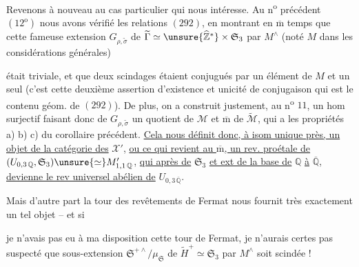 Revenons à nouveau au cas particulier qui nous intéresse. Au n\textsuperscript{o} précédent $(12^{\mathrm o})$ nous avons vérifié les  relations $(292)$, en montrant en $\overline{\mathrm m}$ temps que cette fameuse extension $G_{\rho,\widetilde\sigma}$ de $\widetilde\Gamma\simeq\unsure{\widehat{\mathbb Z}^{*}}\times\mathfrak S_3$ par $M^{\wedge}$ (noté $M$ dans les considérations générales)




était triviale, et que deux scindages étaient conjugués par un élément de $M$ et un seul (c'est cette deuxième assertion d'existence et unicité de conjugaison qui est le contenu géom. de $(292)$).
De plus, on a  construit justement, au n\textsuperscript{o} $11$, un hom surjectif
faisant donc de $G_{\rho,\widetilde\sigma}$ un quotient de $\mathcal M$ et $\overline{\mathrm m}$ de $\widetilde{\mathcal M}$, qui a les propriétés a) b) c) du corollaire précédent. \uline{Cela nous définit donc, à isom unique près, un objet de la catégorie des} $\mathcal X'$,
\uline{ou ce qui revient au $\overline{\mathrm m}$, un rev. proétale de} $(U_{0,3\,\mathbb Q},\mathfrak S_3)\unsure{\simeq}M'_{1,1\,\mathbb Q}$,
\uline{qui après   de} $\mathfrak S_3$ \uline{et ext de la base de} $\mathbb Q$ \uline{à} $\overline{\mathbb Q}$, \uline{devienne le rev universel abélien de} $U_{0,3\,\overline{\mathbb Q}}$.

Mais d'autre part la tour des revêtements de Fermat nous fournit très exactement un tel objet -- et si




je n'avais pas eu à ma disposition cette tour de Fermat, je n'aurais certes pas suspecté que  sous-extension $\mathfrak S^{+\wedge}/\mu_{\mathfrak S}$  de $\widetilde H^+\simeq\mathfrak S_3$ par $M^{\wedge}$ soit scindée !

